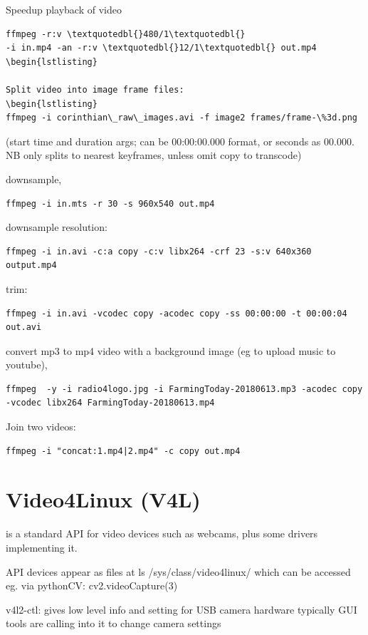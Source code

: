 \documentclass[oneside,english]{scrbook}
\begin{document}
Speedup playback of video 
\begin{lstlisting}
ffmpeg -r:v \textquotedbl{}480/1\textquotedbl{}
-i in.mp4 -an -r:v \textquotedbl{}12/1\textquotedbl{} out.mp4
\begin{lstlisting}

Split video into image frame files: 
\begin{lstlisting}
ffmpeg -i corinthian\_raw\_images.avi -f image2 frames/frame-\%3d.png 
\end{lstlisting}
(start time and duration args; can be 00:00:00.000 format, or seconds as 00.000. NB only splits to nearest keyframes, unless omit copy to transcode)

downsample,
\begin{lstlisting}
ffmpeg -i in.mts -r 30 -s 960x540 out.mp4
\end{lstlisting}

downsample resolution: 
\begin{lstlisting}
ffmpeg -i in.avi -c:a copy -c:v libx264 -crf 23 -s:v 640x360 output.mp4
\end{lstlisting}

trim:
\begin{lstlisting}
ffmpeg -i in.avi -vcodec copy -acodec copy -ss 00:00:00 -t 00:00:04 out.avi
\end{lstlisting}

convert mp3 to mp4 video with a background image (eg to upload music to youtube),
\begin{lstlisting}
ffmpeg  -y -i radio4logo.jpg -i FarmingToday-20180613.mp3 -acodec copy -vcodec libx264 FarmingToday-20180613.mp4
\end{lstlisting}

Join two videos:
\begin{lstlisting}
ffmpeg -i "concat:1.mp4|2.mp4" -c copy out.mp4
\end{lstlisting}


\chapter{Video4Linux (V4L)}

is a standard API for video devices such as webcams, plus some drivers
implementing it.

API devices appear as files at ls /sys/class/video4linux/ which can
be accessed eg. via pythonCV: cv2.videoCapture(3) 

v4l2-ctl: gives low level info and setting for USB camera hardware
typically GUI tools are calling into it to change camera settings
\end{document}
